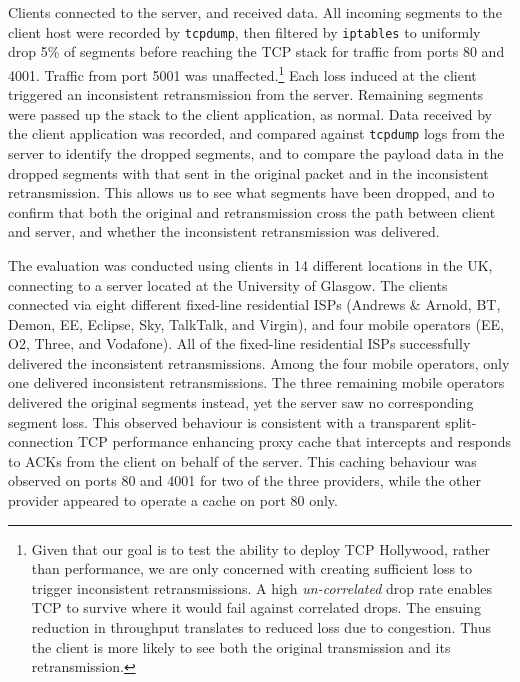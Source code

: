 Clients connected to the server, and received data. All
incoming segments to the client host were recorded by \texttt{tcpdump}, then
filtered by \texttt{iptables} to uniformly drop 5\% of segments before reaching
the TCP stack for traffic from ports 80 and 4001. Traffic from port 5001 was
unaffected.\footnote{Given that our goal is to test the ability to deploy TCP
Hollywood, rather than performance, we are only concerned with creating
sufficient loss to trigger inconsistent retransmissions. A high
\emph{un-correlated} drop rate enables TCP to survive where it would fail
against correlated drops. The ensuing reduction in throughput translates to
reduced loss due to congestion. Thus the client is more likely to see both the
original transmission and its retransmission.} Each loss induced at the client
triggered an inconsistent retransmission from the server.
Remaining segments were passed up the stack to the client application, as
normal. Data received by the client application was recorded, and compared
against \texttt{tcpdump} logs from the server to identify the dropped
segments, and to compare the payload data in the dropped segments with
that sent in the original packet and in the inconsistent retransmission.
This allows us to see what segments have been dropped, and to confirm that
both the original and retransmission cross the path between client and
server, and whether the inconsistent retransmission was delivered.

The evaluation was conducted using clients in 14 different locations in the UK,
connecting to a server located at the University of Glasgow. The clients
connected via eight different fixed-line residential ISPs (Andrews \& Arnold,
BT, Demon, EE, Eclipse, Sky, TalkTalk, and Virgin), and four mobile operators
(EE, O2, Three, and Vodafone).  All of the fixed-line residential ISPs
successfully delivered the inconsistent retransmissions. Among the four mobile
operators, only one delivered inconsistent retransmissions. The three remaining
mobile operators delivered the original segments instead, yet the server saw no
corresponding segment loss. This observed behaviour is consistent with a
transparent split-connection TCP performance enhancing proxy cache that
intercepts and responds to ACKs from the client on behalf of the server. This
caching behaviour was observed on ports 80 and 4001 for two of the three
providers, while the other provider appeared to operate a cache on port 80 only.

